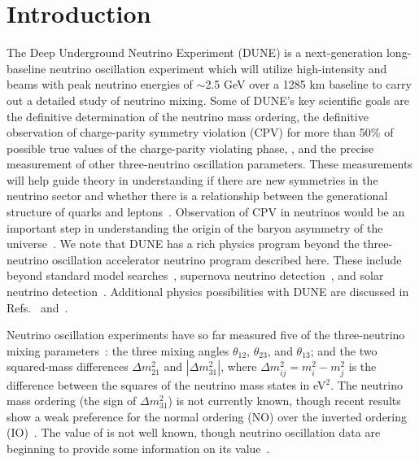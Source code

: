 \section{Introduction}
\label{sec:intro}

The Deep Underground Neutrino Experiment (DUNE) is a next-generation long-baseline neutrino oscillation experiment which will utilize high-intensity \numu and \anumu beams with peak neutrino energies of $\sim$2.5 GeV over a 1285 km baseline to carry out a detailed study of neutrino mixing. Some of DUNE's key scientific goals are the definitive determination of the neutrino mass ordering, the definitive observation of charge-parity symmetry violation (CPV) for more than 50\% of possible true values of the charge-parity violating phase, \deltacp, and the precise measurement of other three-neutrino oscillation parameters.
These measurements will help guide theory in understanding if there are new symmetries in the neutrino sector and whether there is a relationship between the generational structure of quarks and leptons~\cite{Qian:2015waa}. Observation of CPV in neutrinos would be an important step in understanding the origin of the baryon asymmetry of the universe~\cite{Fukugita:1986hr, Davidson:2008bu}. We note that DUNE has a rich physics program beyond the three-neutrino oscillation accelerator neutrino program described here. These include beyond standard model searches~\cite{Abi:2020kei}, supernova neutrino detection~\cite{Abi:2020lpk}, and solar neutrino detection~\cite{Capozzi:2018dat}. Additional physics possibilities with DUNE are discussed in Refs.~\cite{Abi:2020evt} and~\cite{AbedAbud:2021hpb}.

Neutrino oscillation experiments have so far measured five of the three-neutrino mixing parameters~\cite{Capozzi:2017ipn,deSalas:2020pgw,Esteban:2020cvm}: the three mixing angles $\theta_{12}$, $\theta_{23}$, and $\theta_{13}$; and the two squared-mass differences $\Delta m^{2}_{21}$ and $|\Delta m^{2}_{31}|$, where $\Delta m^2_{ij} = m^2_{i} - m^{2}_{j}$ is the difference between the squares of the neutrino mass states in eV$^{2}$.
The neutrino mass ordering (the sign of $\Delta m^{2}_{31}$) is not currently known, though recent results show a weak preference for the normal ordering (NO) over the inverted ordering (IO)~\cite{Abe:2021gky,PhysRevD.97.072001,PhysRevLett.123.151803}.
The value of \deltacp is not well known, though neutrino oscillation data are beginning to provide some information on its value~\cite{Abe:2019vii,Abe:2021gky}.

